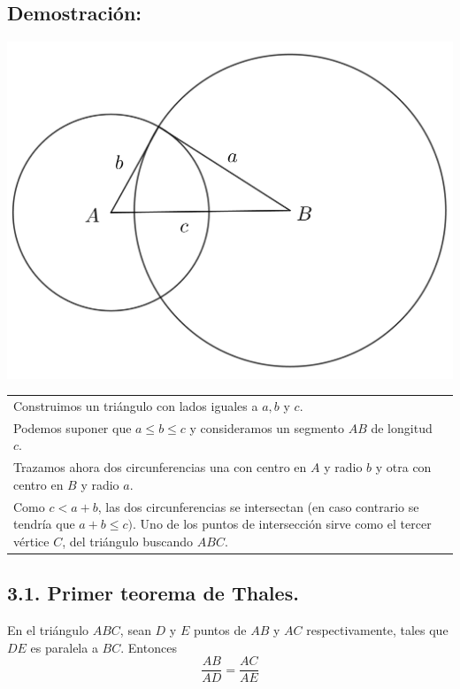 \documentclass[12pt,a4paper]{article}
\begin{document}
\subsection*{Demostración:}
\begin{center}
\includegraphics[scale=0.45]{demo3.png} 
\end{center}
\begin{tabular}{p{15.9cm} p{1cm}}
\\Construimos un triángulo con lados iguales a $a, b$ y $c$. 
\\Podemos suponer que $a \leq b \leq c$ y consideramos un segmento $AB$ de longitud $c$.
\\Trazamos ahora dos circunferencias una con centro en $A$ y radio $b$ y otra con centro en $B$ y radio $a$.
\\Como $c<a+b$, las dos circunferencias se intersectan (en caso contrario se tendría que $a+b \leq c)$. Uno de los puntos de intersección sirve como el tercer vértice $C$, del triángulo buscando $ABC$.
\end{tabular}
\subsection*{3.1. Primer teorema de Thales.}
En el triángulo $ABC$, sean $D$ y $E$ puntos de $AB$
y $AC$ respectivamente, tales que $DE$ es paralela a $BC$. Entonces $$\dfrac{AB}{AD}=\dfrac{AC}{AE}$$
\end{document}
